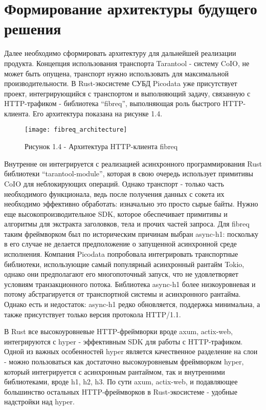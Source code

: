 \documentclass[times,numbers=noenddot]{itmo-student-thesis}
\begin{document}
\section{Формирование архитектуры будущего решения}\label{sec:new_architecture}

Далее необходимо сформировать архитектуру для дальнейшей реализации продукта.
Концепция использования транспорта Tarantool - систему CoIO, не может быть опущена, транспорт нужно использовать для максимальной производительности.
В Rust-экосистеме СУБД Picodata уже присутствует проект, интегрирующийся с транспортом и выполняющий задачу, связанную с HTTP-трафиком - библиотека “fibreq”, выполняющая роль быстрого HTTP-клиента.
Его архитектура показана на рисунке 1.4.

\begin{figure}[!h]
	\caption*{Рисунок 1.4 - Архитектура HTTP-клиента fibreq}\label{fig4}
	\centering
	\texttt{[image: fibreq\_architecture]}
\end{figure}

Внутренне он интегрируется с реализацией асинхронного программирования Rust библиотеки “tarantool-module”, которая в свою очередь использует примитивы CoIO для неблокирующих операций.
Однако транспорт - только часть необходимого функционала, ведь после получения данных с сокета их необходимо эффективно обработать: изначально это просто сырые байты.
Нужно еще высокопроизводительное SDK, которое обеспечивает примитивы и алгоритмы для экстракта заголовков, тела и прочих частей запроса.
Для fibreq таким фреймворком был по историческим причинам выбран async-h1: поскольку в его случае не делается предположение о запущенной асинхронной среде исполнения.
Компания Picodata попробовала интегрировать транспортные библиотеки, использующие самый популярный асинхронный рантайм Tokio, однако они предполагают его многопоточный запуск, что не удовлетворяет условиям транзакционного потока.
Библиотека async-h1 более низкоуровневая и потому абстрагируется от транспортной системы и асинхронного рантайма.
Однако есть и недостаток: async-h1 редко обновляется, поддержка минимальна, а также присутствует только версия протокола HTTP/1.1.

В Rust все высокоуровневые HTTP-фреймворки вроде axum, actix-web, интегрируются с hyper - эффективным SDK для работы с HTTP-трафиком.
Одной из важных особенностей hyper является качественное разделение на слои - можно пользоваться как достаточно высокоуровневым фреймворком hyper, который интегрируется с асинхронным рантаймом, так и внутренними библиотеками, вроде h1, h2, h3.
По сути axum, actix-web, и подавляющее большинство остальных HTTP-фреймворков в Rust-экосистеме - удобные надстройки над hyper.
\end{document}
